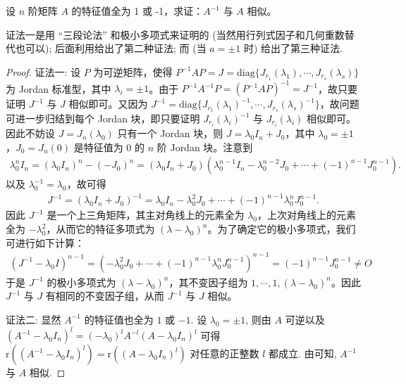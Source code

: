 \documentclass[../../main.tex]{subfiles}
\begin{document}
\begin{proposition}\label{example:特征值全为正负1的矩阵的逆与其自身相似}
设 \(n\) 阶矩阵 \(A\) 的特征值全为 1 或 -1，求证：\(A^{-1}\) 与 \(A\) 相似。
\end{proposition}
\begin{remark}
{\color{blue}证法一}是用 “三段论法” 和极小多项式来证明的 (当然用行列式因子和几何重数替代也可以); 后面利用给出了第二种证法; 而 (当 $a = \pm 1$ 时) 给出了第三种证法. 
\end{remark}
\begin{proof}
{\color{blue}证法一:}
设 \(P\) 为可逆矩阵，使得 \(P^{-1}AP = J=\mathrm{diag}\{J_{r_1}(\lambda_1),\cdots,J_{r_s}(\lambda_s)\}\) 为 Jordan 标准型，其中 \(\lambda_i = \pm1\)。由于 \(P^{-1}A^{-1}P=(P^{-1}AP)^{-1}=J^{-1}\)，故只要证明 \(J^{-1}\) 与 \(J\) 相似即可。又因为 \(J^{-1}=\mathrm{diag}\{J_{r_1}(\lambda_1)^{-1},\cdots,J_{r_s}(\lambda_s)^{-1}\}\)，故问题可进一步归结到每个 Jordan 块，即只要证明 \(J_{r_i}(\lambda_i)^{-1}\) 与 \(J_{r_i}(\lambda_i)\) 相似即可。因此不妨设 \(J = J_n(\lambda_0)\) 只有一个 Jordan 块，则 \(J = \lambda_0I_n+J_0\)，其中 \(\lambda_0 = \pm1\)，\(J_0 = J_n(0)\) 是特征值为 0 的 \(n\) 阶 Jordan 块。注意到
\begin{align*}
\lambda_0^nI_n=(\lambda_0I_n)^n-(-J_0)^n
=(\lambda_0I_n + J_0)(\lambda_0^{n - 1}I_n-\lambda_0^{n - 2}J_0+\cdots+(-1)^{n - 1}J_0^{n - 1}).
\end{align*}
以及 \(\lambda_0^{-1}=\lambda_0\)，故可得
\begin{align*}
J^{-1}=(\lambda_0I_n + J_0)^{-1}=\lambda_0I_n-\lambda_0^2J_0+\cdots+(-1)^{n - 1}\lambda_0^nJ_0^{n - 1}.
\end{align*}
因此 \(J^{-1}\) 是一个上三角矩阵，其主对角线上的元素全为 \(\lambda_0\)，上次对角线上的元素全为 \(-\lambda_0^2\)，从而它的特征多项式为 \((\lambda - \lambda_0)^n\)。为了确定它的极小多项式，我们可进行如下计算：
\begin{align*}
(J^{-1}-\lambda_0I)^{n - 1}=(-\lambda_0^2J_0+\cdots+(-1)^{n - 1}\lambda_0^nJ_0^{n - 1})^{n - 1}=(-1)^{n - 1}J_0^{n - 1}\neq O
\end{align*}
于是 \(J^{-1}\) 的极小多项式为 \((\lambda - \lambda_0)^n\)，其不变因子组为 \(1,\cdots,1,(\lambda - \lambda_0)^n\)。因此 \(J^{-1}\) 与 \(J\) 有相同的不变因子组，从而 \(J^{-1}\) 与 \(J\) 相似。

{\color{blue}证法二:}
显然 $A^{-1}$ 的特征值也全为 $1$ 或 $-1$. 设 $\lambda_0 = \pm 1$, 则由 $A$ 可逆以及 $(A^{-1} - \lambda_0 I_n)^l = (-\lambda_0)^lA^{-l}(A - \lambda_0 I_n)^l$ 可得 $\mathrm{r}((A^{-1} - \lambda_0 I_n)^l) = \mathrm{r}((A - \lambda_0 I_n)^l)$ 对任意的正整数 $l$ 都成立. 由可知, $A^{-1}$ 与 $A$ 相似.
\end{proof}
\end{document}
